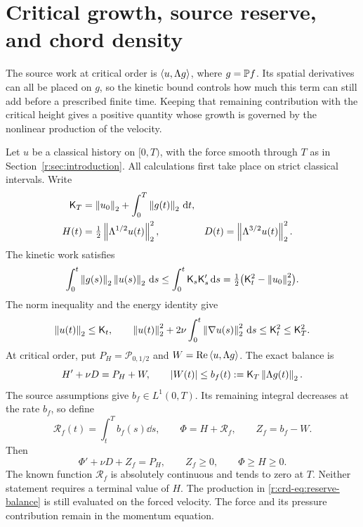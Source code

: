 \section{Critical growth, source reserve, and chord density}
\label{r:sec:critical-reserve-density}

The source work at critical order is \(\left\langle u,\Lambda g\right\rangle\), where
\(g=\mathbb P f\). Its spatial derivatives can all be placed on \(g\), so the
kinetic bound controls how much this term can still add before a prescribed
finite time. Keeping that remaining contribution with the critical height
gives a positive quantity whose growth is governed by the nonlinear
production of the velocity.

Let \(u\) be a classical history on \([0,T)\), with the force smooth through
\(T\) as in Section~\ref{r:sec:introduction}. All calculations first take place
on strict classical intervals. Write
\begin{equation}
 \begin{aligned}
 \mathsf K_T&=\left\lVert u_0\right\rVert_2+\int_0^T\left\lVert g(t)\right\rVert_2\,\mathrm d t,\\
 H(t)&=\tfrac12\left\lVert \Lambda^{1/2}u(t)\right\rVert_2^2,
 &D(t)&=\left\lVert \Lambda^{3/2}u(t)\right\rVert_2^2.
 \end{aligned}
 \label{r:crd-eq:height}
\end{equation}
The kinetic work satisfies
\[
 \int_0^t\left\lVert g(s)\right\rVert_2\left\lVert u(s)\right\rVert_2\,\mathrm d s
 \le\int_0^t\mathsf K_s\mathsf K_s'\,\mathrm d s
 =\tfrac12\bigl(\mathsf K_t^2-\left\lVert u_0\right\rVert_2^2\bigr).
\]
The norm inequality and the energy identity give
\begin{equation}
 \left\lVert u(t)\right\rVert_2\le\mathsf K_t,\qquad
 \left\lVert u(t)\right\rVert_2^2+2\nu\int_0^t\left\lVert \nabla u(s)\right\rVert_2^2\,\mathrm d s
 \le\mathsf K_t^2\le\mathsf K_T^2.
 \label{r:crd-eq:kinetic}
\end{equation}
At critical order, put \(P_H=\mathcal P_{0,1/2}\) and
\(W=\operatorname{Re}\left\langle u,\Lambda g\right\rangle\). The exact balance is
\[
 H'+\nu D=P_H+W,\qquad
 |W(t)|\le b_f(t):=\mathsf K_T\left\lVert \Lambda g(t)\right\rVert_2.
\]
The source assumptions give \(b_f\in L^1(0,T)\). Its remaining integral
decreases at the rate \(b_f\), so define
\begin{equation}
 \mathscr R_f(t)=\int_t^T b_f(s)\dd s,\qquad
 \Phi=H+\mathscr R_f,\qquad Z_f=b_f-W.
 \label{r:crd-eq:reserve}
\end{equation}
Then
\begin{equation}
 \Phi'+\nu D+Z_f=P_H,\qquad
 Z_f\ge0,\qquad \Phi\ge H\ge0.
 \label{r:crd-eq:reserve-balance}
\end{equation}
The known function \(\mathscr R_f\) is absolutely continuous and tends to
zero at \(T\). Neither statement requires a terminal value of \(H\).
The production in \eqref{r:crd-eq:reserve-balance} is still evaluated on the
forced velocity. The force and its pressure contribution remain in the
momentum equation.

